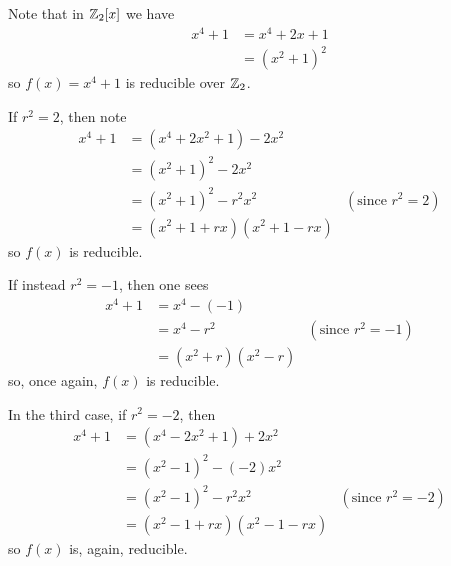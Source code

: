 \begin{questions}
\begin{partquestions}{\alph*}
        \item Note that in $\mathbb{Z}_2[x]$ we have
        \begin{align*}
            x^4 + 1 &= x^4 + 2x + 1\\
            &= (x^2+1)^2
        \end{align*}
        so $f(x) = x^4+1$ is reducible over $\mathbb{Z}_2$.

        \begin{partquestions}{\roman*}
            \item \begin{partquestions}{\alph*}
                \item If $r^2 = 2$, then note
                \begin{align*}
                    x^4 + 1 &= (x^4 + 2x^2 +1) - 2x^2\\
                    &= (x^2+1)^2 - 2x^2\\
                    &= (x^2+1)^2 - r^2x^2 & (\text{since } r^2 = 2)\\
                    &= (x^2+1+rx)(x^2+1-rx)
                \end{align*}
                so $f(x)$ is reducible.

                \item If instead $r^2 = -1$, then one sees
                \begin{align*}
                    x^4 + 1 &= x^4 - (-1)\\
                    &= x^4 - r^2 & (\text{since } r^2 = -1)\\
                    &= (x^2+r)(x^2-r)
                \end{align*}
                so, once again, $f(x)$ is reducible.

                \item In the third case, if $r^2 = -2$, then
                \begin{align*}
                    x^4 + 1 &= (x^4 - 2x^2 +1) + 2x^2\\
                    &= (x^2-1)^2 - (-2)x^2\\
                    &= (x^2-1)^2 - r^2x^2 & (\text{since } r^2 = -2)\\
                    &= (x^2-1+rx)(x^2-1-rx)
                \end{align*}
                so $f(x)$ is, again, reducible.
            \end{partquestions}


\end{partquestions}
\end{partquestions}
\end{questions}
